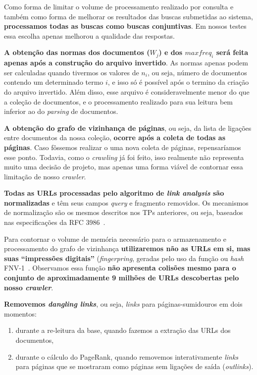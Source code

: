 \documentclass[10pt,twocolumn]{article}
\begin{document}
Como forma de limitar o volume de processamento realizado por consulta e
também como forma de melhorar os resultados das buscas submetidas ao
sistema, \textbf{processamos todas as buscas como buscas conjuntivas}.
Em nossos testes essa escolha apenas melhorou a qualidade das respostas.

\textbf{A obtenção das normas dos documentos (\(W_j\)) e dos
\(maxfreq_i\) será feita apenas após a construção do arquivo invertido}.
As normas apenas podem ser calculadas quando tivermos os valores de
\(n_i\), ou seja, número de documentos contendo um determinado termo
\(i\), e isso só é possível após o termino da criação do arquivo
invertido. Além disso, esse arquivo é consideravelmente menor do que a
coleção de documentos, e o processamento realizado para sua leitura bem
inferior ao do \emph{parsing} de documentos.

\textbf{A obtenção do grafo de vizinhança de páginas}, ou seja, da lista de
ligações entre documentos da nossa coleção, \textbf{ocorre após a coleta de
todas as páginas}. Caso fôssemos realizar o uma nova coleta de páginas,
repensaríamos esse ponto. Todavia, como o \emph{crawling} já foi feito, isso
realmente não representa muito uma decisão de projeto, mas apenas uma
forma viável de contornar essa limitação de nosso \emph{crawler}.


\textbf{Todas as URLs processadas pelo algoritmo de \emph{link analysis} são
normalizadas} e têm seus campos \emph{query} e fragmento removidos. Os
mecanismos de normalização são os mesmos descritos nos TPs anteriores,
ou seja, baseados nas especificações da RFC 3986~\cite{rfc3986}.

Para contornar o volume de memória necessário para o armazenamento e
processamento do grafo de vizinhança \textbf{utilizaremos não as URLs em si, mas
suas ``impressões digitais''} (\emph{fingerpring}, geradas pelo uso da
função ou \emph{hash} FNV-1~\cite{fnv1}. Observamos essa função \textbf{não
apresenta colisões mesmo para o conjunto de aproximadamente 9 milhões de
URLs descobertas pelo nosso \emph{crawler}}.

\textbf{Removemos \emph{dangling links}}, ou seja, \emph{links} para
páginas-sumidouros em dois momentos:
\begin{enumerate}
\item durante a re-leitura da base, quando fazemos a extração das URLs
dos documentos,
\item durante o cálculo do PageRank, quando removemos interativamente
\emph{links} para páginas que se mostraram como páginas sem ligações de 
saída (\emph{outlinks}).
\end{enumerate}
\end{document}
